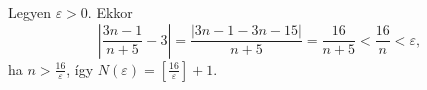 \documentclass[11pt]{scrartcl}
\begin{document}
Legyen $\varepsilon > 0$. Ekkor
\[
	\left| \frac{3n - 1}{n + 5} - 3 \right|
	= \frac{|3n - 1 - 3n - 15|}{n + 5}
	= \frac{16}{n + 5}
	< \frac{16}{n}
	< \varepsilon,
\]
ha \(n > \frac{16}{\varepsilon}\), így
\(
N(\varepsilon) = \left[ \frac{16}{\varepsilon} \right] + 1
\).
\end{document}
